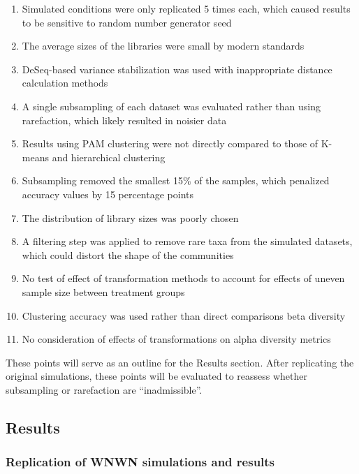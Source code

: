 \documentclass[
]{article}
\providecommand{\tightlist}{%
  \setlength{\itemsep}{0pt}\setlength{\parskip}{0pt}}
\begin{document}
\begin{enumerate}
\def\labelenumi{\arabic{enumi}.}
\tightlist
\item
  Simulated conditions were only replicated 5 times each, which caused
  results to be sensitive to random number generator seed
\item
  The average sizes of the libraries were small by modern standards
\item
  DeSeq-based variance stabilization was used with inappropriate
  distance calculation methods
\item
  A single subsampling of each dataset was evaluated rather than using
  rarefaction, which likely resulted in noisier data
\item
  Results using PAM clustering were not directly compared to those of
  K-means and hierarchical clustering
\item
  Subsampling removed the smallest 15\% of the samples, which penalized
  accuracy values by 15 percentage points
\item
  The distribution of library sizes was poorly chosen
\item
  A filtering step was applied to remove rare taxa from the simulated
  datasets, which could distort the shape of the communities
\item
  No test of effect of transformation methods to account for effects of
  uneven sample size between treatment groups
\item
  Clustering accuracy was used rather than direct comparisons beta
  diversity
\item
  No consideration of effects of transformations on alpha diversity
  metrics
\end{enumerate}

These points will serve as an outline for the Results section. After
replicating the original simulations, these points will be evaluated to
reassess whether subsampling or rarefaction are ``inadmissible''.

\hypertarget{results}{%
\subsection{Results}\label{results}}

\hypertarget{replication-of-wnwn-simulations-and-results}{%
\subsubsection{Replication of WNWN simulations and
results}\label{replication-of-wnwn-simulations-and-results}}
\end{document}
